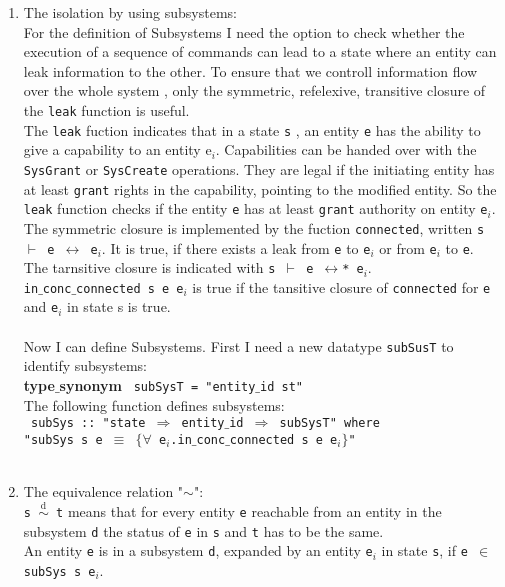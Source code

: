 \begin{enumerate}
\item The isolation by using subsystems: \\
For the definition of Subsystems I need the option to check whether  the execution of a sequence of commands can lead to a state where an entity can leak information to the other. To ensure that we controll information flow over the whole system , only the symmetric, refelexive, transitive closure of the \texttt{leak} function is useful. \\
The  \texttt{leak} fuction \cite{TakeG} indicates that in a state \texttt{s} , an entity \texttt{e} has the ability to give a capability to an entity e$_i$. Capabilities can be handed over with the \texttt{SysGrant} or \texttt{SysCreate} operations. They are legal if the initiating entity has at least \texttt{grant} rights in the capability, pointing to the modified entity. So the \texttt{leak} function checks if the entity \texttt{e} has at least \texttt{grant} authority on entity \texttt{e$_i$}. The symmetric closure is implemented by the fuction \texttt{connected}, written \texttt{s $\vdash$ e $\longleftrightarrow$ e$_i$}. It is true, if there exists a leak from \texttt{e} to \texttt{e$_i$} or from \texttt{e$_i$} to \texttt{e}. \\
The tarnsitive closure is indicated with \texttt{s $\vdash$ e $\longleftrightarrow$* e$_i$}. \\
\texttt{in$\_$conc$\_$connected s e e$_i$} is true  if the tansitive closure of \texttt{connected} for \texttt{e} and \texttt{e$_i$} in state s is true. \\ \\
Now I can define Subsystems. First I need a new datatype \texttt{subSusT} to identify subsystems: \\ 

{\textbf{type$\_$synonym}
\texttt{
subSysT = "entity$\_$id st"}} \\ 

The following function defines subsystems: \\

{
\texttt{
subSys :: "state $\Rightarrow$ entity$\_$id $\Rightarrow$ subSysT" where \\ 
"subSys s e $\equiv$ $\{\forall$ e$_i$.in$\_$conc$\_$connected s e e$_i\}$"}} \\ \\

\item The equivalence relation "$\sim$": \\
\texttt{s $\overset{\text{d}}{\sim}$ t} means that for every entity \texttt{e} reachable from an entity in the subsystem \texttt{d} the status of \texttt{e} in \texttt{s} and \texttt{t} has to be the same. \\
An entity \texttt{e} is in a subsystem \texttt{d}, expanded by an entity \texttt{e$_i$} in state \texttt{s}, if \texttt{e $\in$ subSys s e$_i$}.


\end{enumerate}
